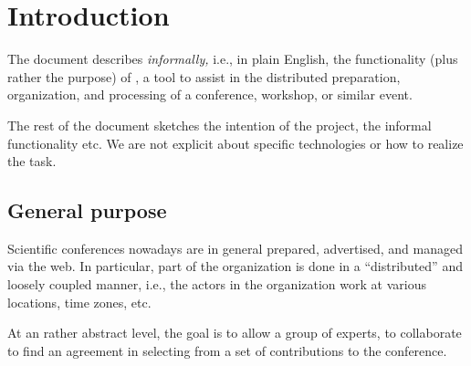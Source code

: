 \section{Introduction}
\label{sec:introduction}




The document describes \emph{informally,} i.e., in plain English, the
functionality (plus rather the purpose) of \Coma, a tool to assist in the
distributed preparation, organization, and processing of a conference,
workshop, or similar event.

The rest of the document sketches the intention of the project, the
informal functionality etc. We are not explicit about specific technologies
or how to realize the task.


\iffalse

As we intend to start \emph{early} with the \emph{integration}, the
required methods should be provided rather quickly without being (fully)
implemented (i.e., as \textit{stubs}). See also the time-line of the
project.

We provide as starting point a first implementation of the abstract syntax
(cf.\ Section~\ref{sec:abstractsyntax}) and a small textual printer in the
utilities package.



If from the perspective of a package, changes or extensions seem necessary
or desirable as far as the abstract syntax is concerned, the wish should be
uttered and justified as early as possible to all participants (and then
potentially implemented by us or the requester, if everyone agrees).

\fi




\subsection{General purpose}
\label{sec:purpose}

Scientific conferences nowadays are in general prepared, advertised, and
managed via the web. In particular, part of the organization is done in a
``distributed'' and loosely coupled manner, i.e., the actors in the
organization work at various locations, time zones, etc.

At an rather abstract level, the goal is to allow a group of experts, to
collaborate to find an agreement in selecting from a set of contributions
to the conference.



\subsection{}








